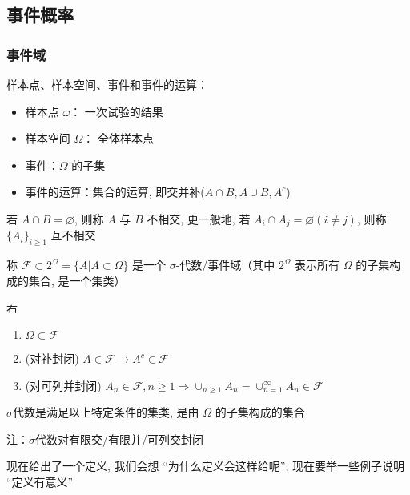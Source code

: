 \subsection{事件概率}

\subsubsection{事件域}

\begin{definition}[样本空间、事件]
    样本点、样本空间、事件和事件的运算：
    \begin{itemize}
        \item 样本点 $\omega$： 一次试验的结果
        \item 样本空间 $\Omega$： 全体样本点
        \item 事件：$\Omega$ 的子集
        \item 事件的运算：集合的运算, 即交并补($A\cap B, A\cup B, A^c$)
    \end{itemize}
\end{definition}

\begin{definition}
    若 $A\cap B=\varnothing$, 则称 $A$ 与 $B$ 不相交, 更一般地, 若 $A_i\cap A_j=\varnothing (i\neq j)$, 则称 $\{A_i\}_{i\geq 1}$ 互不相交
\end{definition}

\begin{definition}[$\sigma$-代数]
    称 $\mathcal{F}\subset 2^{\Omega}=\{A|A\subset \Omega\}$ 是一个 $\sigma$-代数/事件域（其中 $2^{\Omega}$ 表示所有 $\Omega$ 的子集构成的集合, 是一个集类）

    若\begin{enumerate}
        \item $\Omega\subset \mathcal{F}$
        \item (对补封闭) $A\in \mathcal{F}\rightarrow A^c\in \mathcal{F}$
        \item (对可列并封闭) $A_n\in \mathcal{F}, n\geq 1\Rightarrow \cup_{n\geq 1}A_n=\cup_{n=1}^{\infty} A_n\in\mathcal{F}$
    \end{enumerate}

    $\sigma$代数是满足以上特定条件的集类, 是由 $\Omega$ 的子集构成的集合

    注：$\sigma$代数对有限交/有限并/可列交封闭
\end{definition}

现在给出了一个定义, 我们会想 “为什么定义会这样给呢”, 现在要举一些例子说明 “定义有意义”


